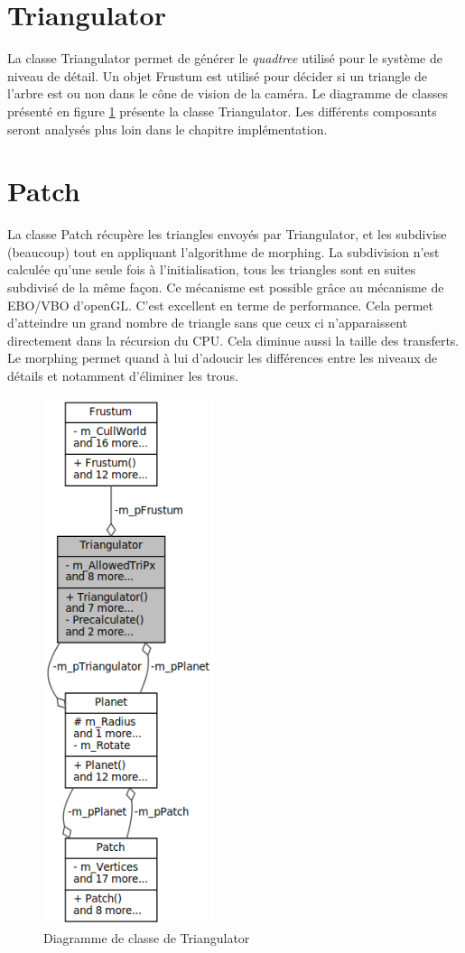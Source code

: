  \section{Triangulator}
  La classe Triangulator permet de générer le \emph{quadtree} utilisé pour le système de niveau de détail.
  Un objet Frustum est utilisé pour décider si un triangle de l'arbre est ou non dans le cône 
  de vision de la caméra. Le diagramme de classes présenté en figure \ref{fig:plan} présente la classe
  Triangulator. Les différents composants seront analysés plus loin dans le chapitre implémentation.
  
  \section{Patch}
  La classe Patch récupère les triangles envoyés par Triangulator, et les subdivise (beaucoup) tout en appliquant l'algorithme de morphing. La subdivision n'est calculée qu'une seule fois à l'initialisation, tous les triangles sont en suites subdivisé de la même façon. Ce mécanisme est possible grâce au mécanisme de EBO/VBO d'openGL. C'est excellent en terme de performance. Cela permet d'atteindre un grand nombre de triangle sans que ceux ci n'apparaissent directement dans la récursion du CPU. Cela diminue aussi la taille des transferts.
  Le morphing permet quand à lui d'adoucir les différences entre les niveaux de détails et notamment d'éliminer les trous.
  
  
  \begin{figure}
  \centering
  \includegraphics[width=5cm]{img/tri_class2.png}
  \caption{Diagramme de classe de Triangulator}
  \label{fig:plan}
  \end{figure}
  
